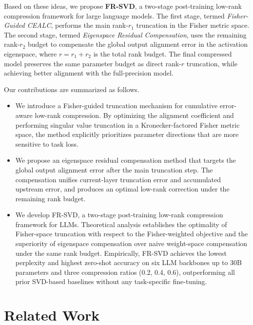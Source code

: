 \documentclass[a4paper,fleqn]{cas-dc}
\begin{document}
Based on these ideas, we propose \textbf{FR-SVD}, a two-stage post-training low-rank compression framework for large language models. The first stage, termed \emph{Fisher-Guided CEALC}, performs the main rank-$r_1$ truncation in the Fisher metric space. The second stage, termed \emph{Eigenspace Residual Compensation}, uses the remaining rank-$r_2$ budget to compensate the global output alignment error in the activation eigenspace, where $r=r_1+r_2$ is the total rank budget. The final compressed model preserves the same parameter budget as direct rank-$r$ truncation, while achieving better alignment with the full-precision model.

Our contributions are summarized as follows.
\begin{itemize}[leftmargin=1.5em]
    \item We introduce a Fisher-guided truncation mechanism for cumulative error-aware low-rank compression. By optimizing the alignment coefficient and performing singular value truncation in a Kronecker-factored Fisher metric space, the method explicitly prioritizes parameter directions that are more sensitive to task loss.
    \item We propose an eigenspace residual compensation method that targets the global output alignment error after the main truncation step. The compensation unifies current-layer truncation error and accumulated upstream error, and produces an optimal low-rank correction under the remaining rank budget.
    \item We develop FR-SVD, a two-stage post-training low-rank compression framework for LLMs. Theoretical analysis establishes the optimality of Fisher-space truncation with respect to the Fisher-weighted objective and the superiority of eigenspace compensation over naive weight-space compensation under the same rank budget. Empirically, FR-SVD achieves the lowest perplexity and highest zero-shot accuracy on six LLM backbones up to 30B parameters and three compression ratios (0.2, 0.4, 0.6), outperforming all prior SVD-based baselines without any task-specific fine-tuning.
\end{itemize}

\section{Related Work}
\end{document}
